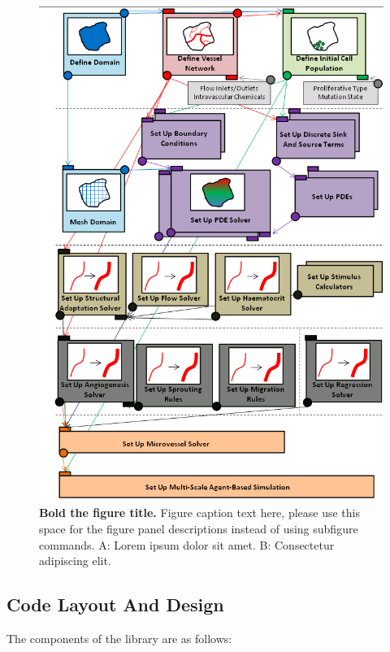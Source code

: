 \documentclass[10pt,letterpaper]{article}
\begin{document}
\begin{figure}[!h]
\centering
\includegraphics[width=1.0\textwidth]{Fig1.png}
\caption{{\bf Bold the figure title.}
Figure caption text here, please use this space for the figure panel descriptions instead of using subfigure commands. A: Lorem ipsum dolor sit amet. B: Consectetur adipiscing elit.}
\label{fig1}
\end{figure}

\subsection*{Code Layout And Design}

The components of the library are as follows:
\end{document}
